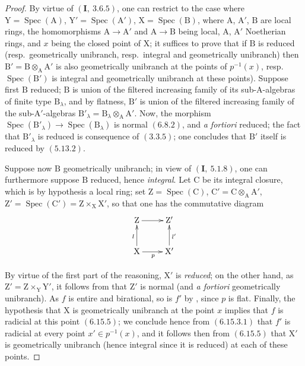 \begin{proof}
By virtue of $(\mathbf{I},~3.6.5)$, one can restrict to the case where $\mathrm{Y}=\operatorname{Spec}(\mathrm{A})$, $\mathrm{Y}'=\operatorname{Spec}(\mathrm{A}')$,
$\mathrm{X}=\operatorname{Spec}(\mathrm{B})$, where $\mathrm{A}$, $\mathrm{A}'$, $\mathrm{B}$ are local rings, the homomorphisms $\mathrm{A}\to\mathrm{A}'$
and $\mathrm{A}\to\mathrm{B}$ being local, $\mathrm{A}$, $\mathrm{A}'$ Noetherian rings, and $x$ being the closed point of $\mathrm{X}$;
it suffices to prove that if $\mathrm{B}$ is reduced (resp.\ geometrically unibranch,
resp.\ integral and geometrically unibranch) then $\mathrm{B}'=\mathrm{B}\otimes_\mathrm{A}\mathrm{A}'$ is also geometrically
unibranch at the points of $p^{-1}(x)$, resp.\ $\operatorname{Spec}(\mathrm{B}')$ is integral and geometrically
unibranch at these points). Suppose first $\mathrm{B}$ reduced; $\mathrm{B}$ is
union of the filtered increasing family of its sub-$\mathrm{A}$-algebras of finite type $\mathrm{B}_\lambda$, and by flatness, $\mathrm{B}'$ is
union of the filtered increasing family of the sub-$\mathrm{A}'$-algebras $\mathrm{B}'_\lambda=\mathrm{B}_\lambda\otimes_\mathrm{A}\mathrm{A}'$. Now, the
morphism $\operatorname{Spec}(\mathrm{B}'_\lambda)\to\operatorname{Spec}(\mathrm{B}_\lambda)$ is normal $(6.8.2)$, and \emph{a fortiori} reduced; the fact that $\mathrm{B}'_\lambda$
is reduced is consequence of $(3.3.5)$; one concludes that $\mathrm{B}'$ itself is reduced
by $(5.13.2)$.

Suppose now $\mathrm{B}$ geometrically unibranch; in view of $(\mathbf{I},~5.1.8)$,
one can furthermore suppose $\mathrm{B}$ reduced, hence \emph{integral}. Let $\mathrm{C}$ be its integral closure, which is
by hypothesis a local ring; set $\mathrm{Z}=\operatorname{Spec}(\mathrm{C})$, $\mathrm{C}'=\mathrm{C}\otimes_\mathrm{A}\mathrm{A}'$, $\mathrm{Z}'=\operatorname{Spec}(\mathrm{C}')=\mathrm{Z}\times_\mathrm{X}\mathrm{X}'$,
so that one has the commutative diagram
\[
\xymatrix{
  \mathrm{Z} \ar[r] & \mathrm{Z}' \\
  \mathrm{X} \ar[u]^{l} \ar[r]_{p} & \mathrm{X}' \ar[u]_{l'}
}
\]

By virtue of the first part of the reasoning, $\mathrm{X}'$ is \emph{reduced}; on the other hand, as
$\mathrm{Z}'=\mathrm{Z}\times_\mathrm{Y}\mathrm{Y}'$, it follows from  that $\mathrm{Z}'$ is normal (and \emph{a fortiori} geometrically
unibranch). As $f$ is entire and birational, so is $f'$ by
, since $p$ is flat. Finally, the hypothesis that $\mathrm{X}$ is geometrically
unibranch at the point $x$ implies that $f$ is radicial at this point $(6.15.5)$; we conclude
hence from $(6.15.3.1)$ that $f'$ is radicial at every point $x'\in p^{-1}(x)$, and it follows then from
$(6.15.5)$ that $\mathrm{X}'$ is geometrically unibranch (hence integral since it is reduced)
at each of these points.
\end{proof}

